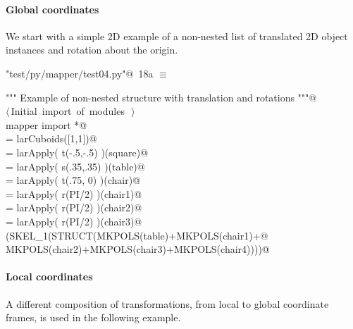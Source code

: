 \documentclass[11pt,oneside]{article}	%
\begin{document}
\paragraph{Global coordinates}
We start with a simple 2D example of a non-nested list of translated 2D object instances and rotation about the origin.

\begin{flushleft} \small \label{scrap33}
\protect{}\verb@"test/py/mapper/test04.py"@\nobreak\ {\footnotesize 18a }$\equiv$
\vspace{-1ex}
\begin{list}{}{} \item
\mbox{}\verb@""" Example of non-nested structure with translation and rotations """@\\
\mbox{}\verb@@\hbox{$\langle\,$Initial import of modules\nobreak\ {\footnotesize {}}$\,\rangle$}\verb@@\\
\mbox{}\verb@from mapper import *@\\
\mbox{}\verb@square = larCuboids([1,1])@\\
\mbox{}\verb@table = larApply( t(-.5,-.5) )(square)@\\
\mbox{}\verb@chair = larApply( s(.35,.35) )(table)@\\
\mbox{} = larApply( t(.75, 0) )(chair)@\\
\mbox{} = larApply( r(PI/2) )(chair1)@\\
\mbox{} = larApply( r(PI/2) )(chair2)@\\
\mbox{} = larApply( r(PI/2) )(chair3)@\\
\mbox{}\verb@VIEW(SKEL_1(STRUCT(MKPOLS(table)+MKPOLS(chair1)+@\\
\mbox{}\verb@               MKPOLS(chair2)+MKPOLS(chair3)+MKPOLS(chair4))))@\\
\mbox{}\verb@@{\NWsep}
\end{list}
\vspace{-2ex}
\end{flushleft}

\paragraph{Local coordinates}
A different composition of transformations, from local to global coordinate frames, is used in the following example.
\end{document}
